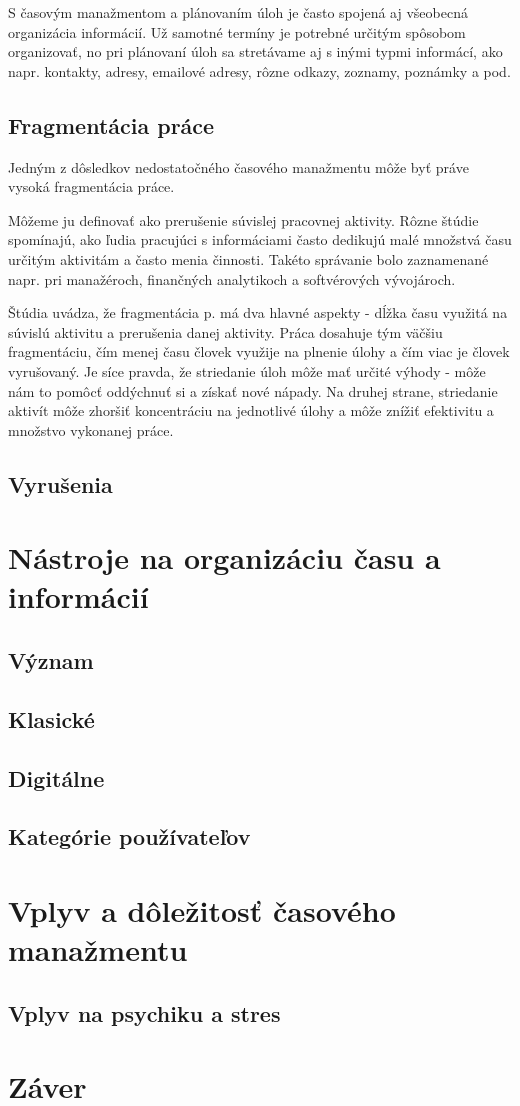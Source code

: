 \documentclass[10pt,slovak,a4paper]{article}
\begin{document}
		S časovým manažmentom a plánovaním úloh je často spojená aj všeobecná organizácia informácií. Už samotné termíny je potrebné určitým spôsobom organizovať, no pri plánovaní úloh sa stretávame aj s inými typmi informácí, ako napr. kontakty, adresy, emailové adresy, rôzne odkazy, zoznamy, poznámky a pod.
	
	\subsection{Fragmentácia práce}
		Jedným z dôsledkov nedostatočného časového manažmentu môže byť práve vysoká fragmentácia práce.
		
		Môžeme ju definovať ako prerušenie súvislej pracovnej aktivity. Rôzne štúdie spomínajú, ako ľudia pracujúci s informáciami často dedikujú malé množstvá času určitým aktivitám a často menia činnosti. Takéto správanie bolo zaznamenané napr. pri manažéroch, finančných analytikoch a softvérových vývojároch\cite{NoTask}.
		
		Štúdia\cite{NoTask} uvádza, že fragmentácia p. má dva hlavné aspekty - dĺžka času využitá na súvislú aktivitu a prerušenia danej aktivity. Práca dosahuje tým väčšiu fragmentáciu, čím menej času človek využije na plnenie úlohy a čím viac je človek vyrušovaný. Je síce pravda, že striedanie úloh môže mať určité výhody - môže nám to pomôcť oddýchnuť si a získať nové nápady. Na druhej strane, striedanie aktivít môže zhoršiť koncentráciu na jednotlivé úlohy a môže znížiť efektivitu a množstvo vykonanej práce\cite{NoTask}.
		
	\subsection{Vyrušenia}

\section{Nástroje na organizáciu času a informácií}
	\subsection{Význam}
	\subsection{Klasické}
	\subsection{Digitálne}
	\subsection{Kategórie používateľov}

\section{Vplyv a dôležitosť časového manažmentu}
% 
	\subsection{Vplyv na psychiku a stres}
\section{Záver}



\end{document}
